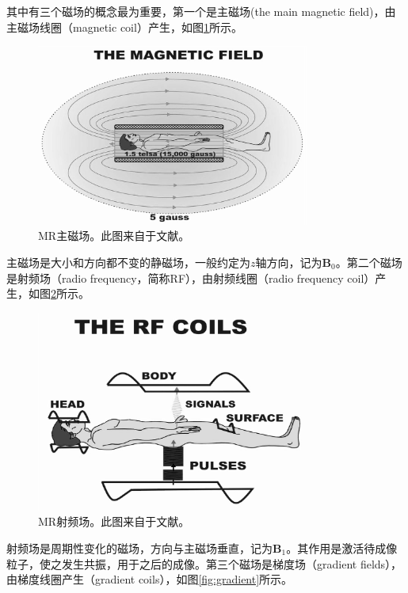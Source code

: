 其中有三个磁场的概念最为重要，第一个是主磁场(the main magnetic field)，由主磁场线圈（magnetic coil）产生，如图\ref{fig:main}所示。
\begin{figure}[htbp]
\centering
\includegraphics[width=0.8\textwidth]{img/intro/main.eps}
\caption{MR主磁场。此图来自于文献\cite{sprawls2000magnetic}。}
\label{fig:main}
\end{figure}
主磁场是大小和方向都不变的静磁场，一般约定为$z$轴方向，记为$\mathrm{\textbf{B}}_0$。第二个磁场是射频场（radio frequency，简称RF），由射频线圈（radio frequency coil）产生，如图\ref{fig:rf}所示。
\begin{figure}[htbp]
\centering
\includegraphics[width=0.8\textwidth]{img/intro/rf.eps}
\caption{MR射频场。此图来自于文献\cite{sprawls2000magnetic}。}
\label{fig:rf}
\end{figure}
射频场是周期性变化的磁场，方向与主磁场垂直，记为$\mathrm{\textbf{B}}_1$。其作用是激活待成像粒子，使之发生共振，用于之后的成像。第三个磁场是梯度场（gradient fields），由梯度线圈产生（gradient coils），如图\ref{fig:gradient}所示。
